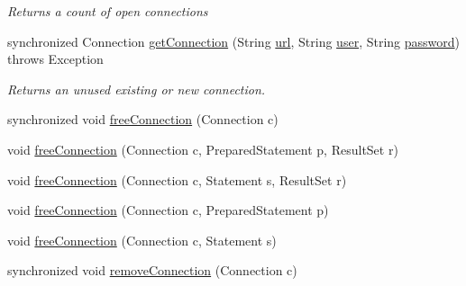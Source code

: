 \begin{DoxyCompactItemize}
\begin{DoxyCompactList}\small\item\em Returns a count of open connections \end{DoxyCompactList}\item 
synchronized Connection \mbox{\hyperlink{classcom_1_1github_1_1aites_1_1framework_1_1globalknowledge_1_1_d_b_connection_mgr_a9617a483f23c094ac0d6c2096f748d04}{get\+Connection}} (String \mbox{\hyperlink{classcom_1_1github_1_1aites_1_1framework_1_1globalknowledge_1_1_d_b_connection_mgr_a86e734da035245fae5ee3a77ba92d7a9}{url}}, String \mbox{\hyperlink{classcom_1_1github_1_1aites_1_1framework_1_1globalknowledge_1_1_d_b_connection_mgr_a23c20259e7ddd8b5d7d82aff18db1034}{user}}, String \mbox{\hyperlink{classcom_1_1github_1_1aites_1_1framework_1_1globalknowledge_1_1_d_b_connection_mgr_a0c6550844ff29a2f303d7ca3f059d535}{password}})  throws Exception
\begin{DoxyCompactList}\small\item\em Returns an unused existing or new connection. \end{DoxyCompactList}\item 
synchronized void \mbox{\hyperlink{classcom_1_1github_1_1aites_1_1framework_1_1globalknowledge_1_1_d_b_connection_mgr_a4c1302a674f9c74b55f6fae96bf79b64}{free\+Connection}} (Connection c)
\item 
void \mbox{\hyperlink{classcom_1_1github_1_1aites_1_1framework_1_1globalknowledge_1_1_d_b_connection_mgr_a54e99002c055092686c458470c534fb7}{free\+Connection}} (Connection c, Prepared\+Statement p, Result\+Set r)
\item 
void \mbox{\hyperlink{classcom_1_1github_1_1aites_1_1framework_1_1globalknowledge_1_1_d_b_connection_mgr_aa9fc116a50cb0e1e8689b30d5d2ecd27}{free\+Connection}} (Connection c, Statement s, Result\+Set r)
\item 
void \mbox{\hyperlink{classcom_1_1github_1_1aites_1_1framework_1_1globalknowledge_1_1_d_b_connection_mgr_a7f42210ce41c75a91b96b8bebb276f6f}{free\+Connection}} (Connection c, Prepared\+Statement p)
\item 
void \mbox{\hyperlink{classcom_1_1github_1_1aites_1_1framework_1_1globalknowledge_1_1_d_b_connection_mgr_a437d75014e39b55db0482e8988db054d}{free\+Connection}} (Connection c, Statement s)
\item 
synchronized void \mbox{\hyperlink{classcom_1_1github_1_1aites_1_1framework_1_1globalknowledge_1_1_d_b_connection_mgr_a0174f80ba00e50211d2b3faff76ee5d3}{remove\+Connection}} (Connection c)
\item 

\end{DoxyCompactItemize}

